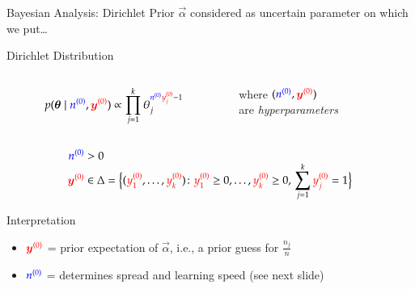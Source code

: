 \documentclass{beamer}
\def\rot#1{{\color{red}#1}}
\def\gruen#1{{\color{blue}#1}}
\def\byzr{\rot{\byz}}
\def\yzor{\rot{y\uz_1}}
\def\yzjr{\rot{y\uz_j}}
\def\yzkr{\rot{y\uz_k}}
\def\nzg{\gruen{\nz}}
\begin{document}
\begin{frame}{Bayesian Analysis: Dirichlet Prior}
  $\vec{\alpha}$ considered as uncertain parameter on which we put\dots
  \begin{block}{Dirichlet Distribution}
  \begin{columns}
  \begin{column}{0.65\textwidth}
    \begin{align*}
      p(\vec{\theta}\mid \nzg,\byzr) \propto \prod_{j=1}^k\theta_j^{\nzg\yzjr-1}
    \end{align*}
  \end{column}  
  \begin{column}{0.35\textwidth}
    \rule{0ex}{3ex}where $(\nzg, \byzr)$\\ are \emph{hyperparameters}
 \end{column}
 \end{columns}\vspace*{-1.8ex}
    \begin{align*}
      \nzg &> 0\\[-1ex]
      \byzr &\in \Delta=\Big\{
        (\yzor,\dots,\yzkr)\colon \yzor\ge0,\dots,\yzkr\ge 0,\,\sum_{j=1}^k \yzjr=1
      \Big\}
    \end{align*}
  \end{block}
  \vspace*{-0.5ex}
  \begin{block}{Interpretation}
    \begin{itemize}
    \item $\byzr$ = \alert{prior expectation of $\vec{\alpha}$}, i.e., a prior guess for $\frac{n_j}{n}$ %
    \item $\nzg$ = determines \alert{spread} and \alert{learning speed} (see next slide)
    \end{itemize}
  \end{block}
\end{frame}
\end{document}
